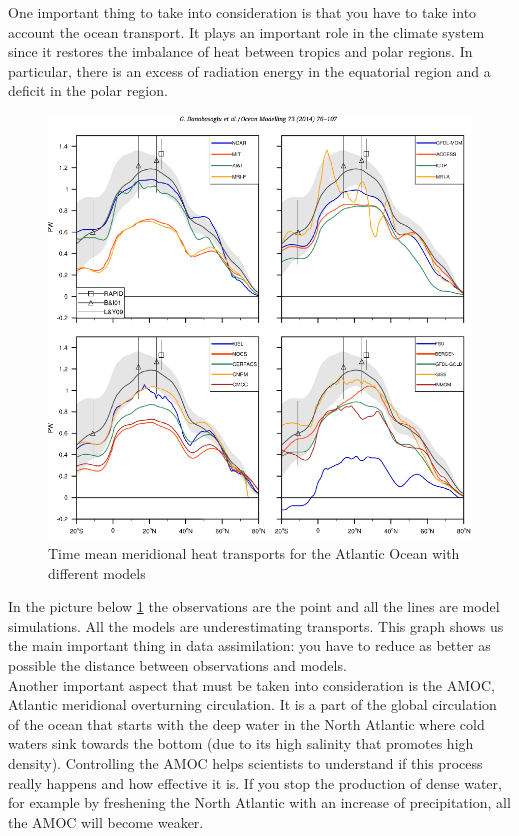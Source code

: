 One important thing to take into consideration is that you have to take into account the ocean transport. It plays an important role in the climate system since it restores the imbalance of heat between tropics and polar regions. In particular, there is an excess of radiation energy in the equatorial region and a deficit in the polar region. 
\begin{figure}[htpb]
    \centering
    \includegraphics[width=0.5\linewidth]{uploads/image9.png}
    \caption{Time mean meridional heat transports for the Atlantic Ocean with different models}
    \label{fig:12}
\end{figure}
In the picture below \ref{fig:12} the observations are the point and all the lines are model simulations. All the models are underestimating transports.
This graph shows us the main important thing in data assimilation: you have to reduce as better as possible the distance between observations and models. \\






Another important aspect that must be taken into consideration is the AMOC, Atlantic meridional overturning circulation. It is a part of the global circulation of the ocean that starts with the deep water in the North Atlantic where cold waters sink towards the bottom (due to its high salinity that promotes high density). 
Controlling the AMOC helps scientists to understand if this process really happens and how effective it is. 
If you stop the production of dense water, for example by freshening the North Atlantic with an increase of precipitation, all the AMOC will become weaker. 

